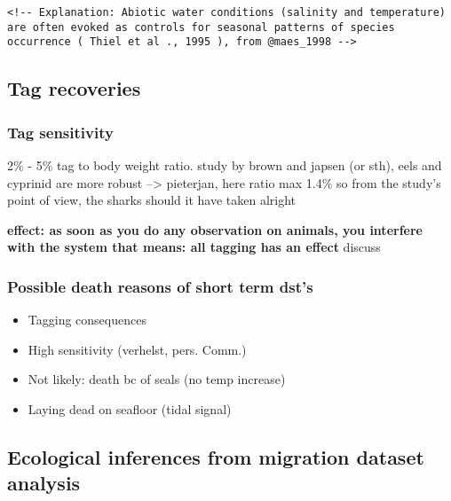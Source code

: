 \documentclass[
  authoryear,
  review,
  3p]{elsarticle}
\providecommand{\tightlist}{%
  \setlength{\itemsep}{0pt}\setlength{\parskip}{0pt}}\usepackage{longtable,booktabs,array}
\begin{document}
\begin{verbatim}
<!-- Explanation: Abiotic water conditions (salinity and temperature) are often evoked as controls for seasonal patterns of species occurrence ( Thiel et al ., 1995 ), from @maes_1998 -->
\end{verbatim}

\hypertarget{tag-recoveries}{%
\subsection{Tag recoveries}\label{tag-recoveries}}

\hypertarget{tag-sensitivity}{%
\subsubsection{Tag sensitivity}\label{tag-sensitivity}}

2\% - 5\% tag to body weight ratio. study by brown and japsen (or sth),
eels and cyprinid are more robust --\textgreater{} pieterjan, here ratio
max 1.4\% so from the study's point of view, the sharks should it have
taken alright

\textbf{effect: as soon as you do any observation on animals, you
interfere with the system that means: all tagging has an effect} discuss

\hypertarget{possible-death-reasons-of-short-term-dsts}{%
\subsubsection{Possible death reasons of short term
dst's}\label{possible-death-reasons-of-short-term-dsts}}

\begin{itemize}
\tightlist
\item
  Tagging consequences
\item
  High sensitivity (verhelst, pers. Comm.)
\item
  Not likely: death bc of seals (no temp increase)
\item
  Laying dead on seafloor (tidal signal)
\end{itemize}

\hypertarget{ecological-inferences-from-migration-dataset-analysis}{%
\subsection{Ecological inferences from migration dataset
analysis}\label{ecological-inferences-from-migration-dataset-analysis}}
\end{document}
